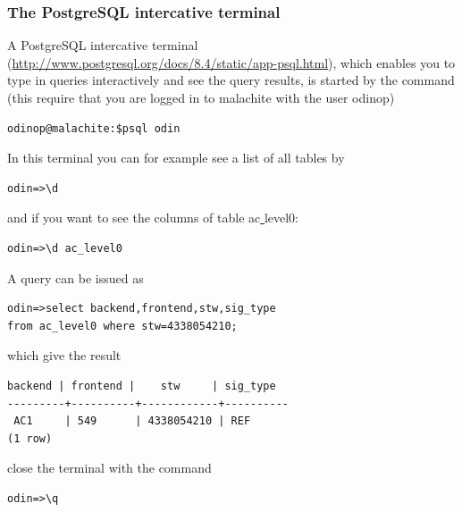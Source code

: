 \documentclass[12pt]{article}
\begin{document}
\subsubsection{The PostgreSQL intercative terminal} 
\label{sec:psql}
A PostgreSQL intercative terminal (\url{http://www.postgresql.org/docs/8.4/static/app-psql.html}), which enables you to type in queries 
interactively and see the query results, 
is started by the command (this require that you are logged in 
to malachite with the user odinop)  
\begin{verbatim}
odinop@malachite:$psql odin
\end{verbatim}
In this terminal you can for example see a list of all tables by
\begin{verbatim}
odin=>\d
\end{verbatim}
and if you want to see the columns of table ac\underline{ }level0:
\begin{verbatim}
odin=>\d ac_level0
\end{verbatim}
A query can be issued as
\begin{verbatim}
odin=>select backend,frontend,stw,sig_type 
from ac_level0 where stw=4338054210;
\end{verbatim}
which give the result
\begin{verbatim}
backend | frontend |    stw     | sig_type 
---------+----------+------------+----------
 AC1     | 549      | 4338054210 | REF
(1 row)
\end{verbatim}
close the terminal with the command 
\begin{verbatim}
odin=>\q
\end{verbatim}
\end{document}
